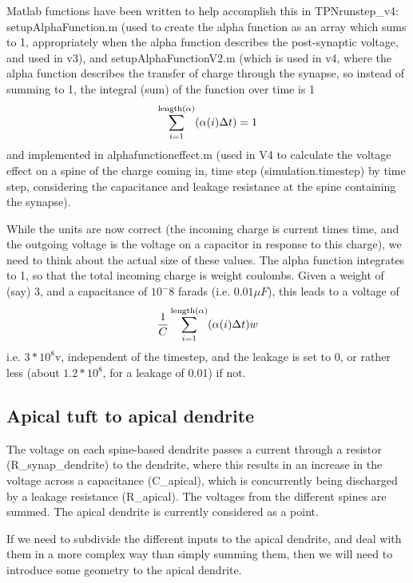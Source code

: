 \documentclass[11pt, oneside]{article}   	%
\begin{document}
Matlab functions have been written to help accomplish this in TPNrunstep\_v4: setupAlphaFunction.m (used to create the alpha function as an array which sums to 1, appropriately when the alpha function describes the post-synaptic voltage, and  used in v3), and setupAlphaFunctionV2.m (which  is used in v4, where the alpha function
describes the transfer of charge through  the synapse, so
instead of summing to 1, the integral (sum) of the function
over time is 1 
\begin{equation}
\sum_{i = 1}^{ {\rm length}(\alpha)} (\alpha(i) \Delta t) = 1
\end{equation}
and implemented in alphafunctioneffect.m (used in V4 to calculate the voltage  effect on a spine of the charge coming in, time step  (simulation.timestep) by time step, considering the capacitance and leakage resistance at the spine containing the synapse).

While the units are now correct (the incoming charge is current  times time, and the outgoing voltage is the voltage on a capacitor in response to this charge), we need to think about the actual size of these values. The alpha function integrates to 1, so that the total incoming charge is weight  coulombs. Given a weight of (say) 3, and a capacitance of $10^-8$ farads (i.e. $0.01 \mu F$), this leads to a voltage of 
\begin{equation}
\frac{1}{C}\sum_{i = 1}^{ {\rm length}(\alpha)} (\alpha(i) \Delta t)  w
\end{equation}
i.e. $3 * 10^8$v, independent of  the timestep, and the leakage is set to 0, or rather less (about $1.2 * 10^8$, for a leakage of 0.01) if not.


\subsection{Apical tuft to apical dendrite}
The voltage on each spine-based dendrite passes a current through a resistor (R\_synap\_dendrite) to the dendrite, where this results in an increase in the voltage across a capacitance (C\_apical), which is concurrently being discharged by a leakage resistance (R\_apical). The voltages from the different spines are summed. The apical dendrite is currently considered as a point.

If we need to subdivide the different inputs to the apical dendrite, and deal with them in a more complex way than simply summing them, then we will need to introduce some geometry to the apical dendrite. 
\end{document}
